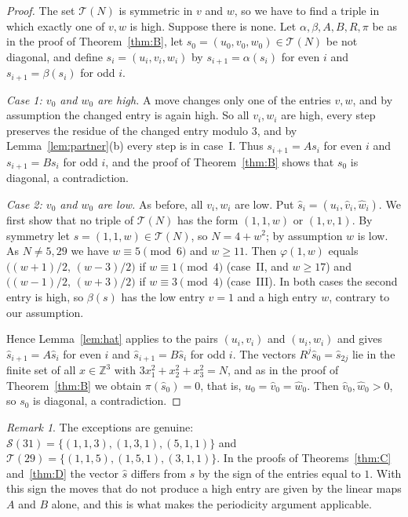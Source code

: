 \documentclass[11pt]{amsart}
\theoremstyle{definition}
\theoremstyle{remark}
\newtheorem{remark}[theorem]{Remark}
\newcommand{\Z}{\mathbb{Z}}
\newcommand{\cS}{\mathcal{S}}
\newcommand{\cT}{\mathcal{T}}
\begin{document}
\begin{proof}
The set $\cT(N)$ is symmetric in $v$ and $w$, so we have to find a triple in which exactly one of $v,w$ is high.
Suppose there is none. Let $\alpha,\beta,A,B,R,\pi$ be as in the proof of Theorem~\ref{thm:B}, let $s_0=(u_0,v_0,w_0)\in\cT(N)$ be not diagonal,
and define $s_i=(u_i,v_i,w_i)$ by $s_{i+1}=\alpha(s_i)$ for even $i$ and $s_{i+1}=\beta(s_i)$ for odd $i$.

\emph{Case 1: $v_0$ and $w_0$ are high.} A move changes only one of the entries $v,w$, and by assumption the changed entry is again high.
So all $v_i,w_i$ are high, every step preserves the residue of the changed entry modulo $3$, and by Lemma~\ref{lem:partner}(b) every step is in case~I.
Thus $s_{i+1}=As_i$ for even $i$ and $s_{i+1}=Bs_i$ for odd $i$, and the proof of Theorem~\ref{thm:B} shows that $s_0$ is diagonal, a contradiction.

\emph{Case 2: $v_0$ and $w_0$ are low.} As before, all $v_i,w_i$ are low. Put $\hat s_i=(u_i,\hat v_i,\hat w_i)$.
We first show that no triple of $\cT(N)$ has the form $(1,1,w)$ or $(1,v,1)$. By symmetry let $s=(1,1,w)\in\cT(N)$, so $N=4+w^2$; by assumption $w$ is low.
As $N\ne 5,29$ we have $w\equiv 5\pmod 6$ and $w\ge 11$.
Then $\varphi(1,w)$ equals $\bigl((w+1)/2,\,(w-3)/2\bigr)$ if $w\equiv 1\pmod 4$ (case~II, and $w\ge 17$) and $\bigl((w-1)/2,\,(w+3)/2\bigr)$ if $w\equiv 3\pmod 4$ (case~III).
In both cases the second entry is high, so $\beta(s)$ has the low entry $v=1$ and a high entry $w$, contrary to our assumption.

Hence Lemma~\ref{lem:hat} applies to the pairs $(u_i,v_i)$ and $(u_i,w_i)$ and gives $\hat s_{i+1}=A\hat s_i$ for even $i$ and $\hat s_{i+1}=B\hat s_i$ for odd $i$.
The vectors $R^j\hat s_0=\hat s_{2j}$ lie in the finite set of all $x\in\Z^3$ with $3x_1^2+x_2^2+x_3^2=N$, and as in the proof of Theorem~\ref{thm:B} we obtain $\pi(\hat s_0)=0$,
that is, $u_0=\hat v_0=\hat w_0$. Then $\hat v_0,\hat w_0>0$, so $s_0$ is diagonal, a contradiction.
\end{proof}

\begin{remark}\label{rem:exceptions}
The exceptions are genuine: $\cS(31)=\{(1,1,3),(1,3,1),(5,1,1)\}$ and $\cT(29)=\{(1,1,5),(1,5,1),(3,1,1)\}$.
In the proofs of Theorems~\ref{thm:C} and~\ref{thm:D} the vector $\hat s$ differs from $s$ by the sign of the entries equal to $1$.
With this sign the moves that do not produce a high entry are given by the linear maps $A$ and $B$ alone, and this is what makes the periodicity argument applicable.
\end{remark}
\end{document}
